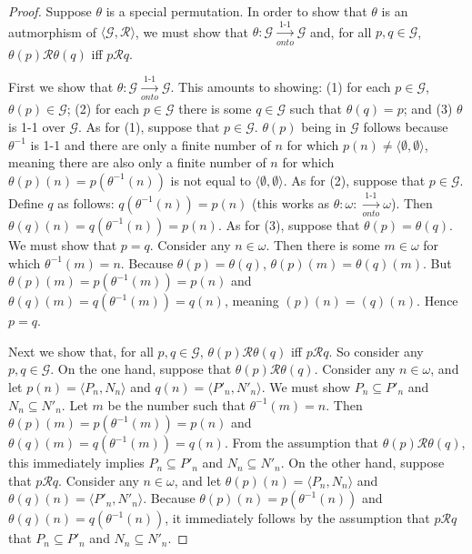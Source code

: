 \documentclass{article}
\theoremstyle{definition}
\begin{document}
\begin{proof}
Suppose $\theta$ is a special permutation. In order to show that $\theta$ is an autmorphism of $\langle\mathcal{G},\mathcal{R}\rangle$, 
we must show that $\theta:\mathcal{G}\xrightarrow[onto]{\text{1-1}}\mathcal{G}$ and, for all $p,q\in\mathcal{G}$, 
$\theta(p)\mathcal{R}\theta(q)$ iff $p\mathcal{R}q$.

First we show that $\theta:\mathcal{G}\xrightarrow[onto]{\text{1-1}}\mathcal{G}$. This amounts to showing: (1) 
for each $p\in\mathcal{G}$, $\theta(p)\in\mathcal{G}$; (2) 
for each $p\in\mathcal{G}$ there is some $q\in\mathcal{G}$ such that $\theta(q)=p$; and (3) 
$\theta$ is 1-1 over $\mathcal{G}$. As for (1), suppose that $p\in\mathcal{G}$. $\theta(p)$ 
being in $\mathcal{G}$ follows because $\theta^{-1}$ is 1-1 and there are only a finite number of 
$n$ for which $p(n)\ne\langle\emptyset,\emptyset\rangle$, meaning there are also only a finite number of 
$n$ for which $\theta(p)(n)=p(\theta^{-1}(n))$ is not equal to $\langle\emptyset,\emptyset\rangle$. 
As for (2), suppose that $p\in\mathcal{G}$. Define $q$ as follows: 
$q(\theta^{-1}(n))=p(n)$ (this works as $\theta:\omega:\xrightarrow[onto]{\text{1-1}}\omega$).
Then $\theta(q)(n)=q(\theta^{-1}(n))=p(n)$. As for (3), suppose that 
$\theta(p)=\theta(q)$. We must show that $p=q$. Consider any 
$n\in\omega$. Then there is some $m\in\omega$ for which $\theta^{-1}(m)=n$. Because 
$\theta(p)=\theta(q)$, $\theta(p)(m)=\theta(q)(m)$. But 
$\theta(p)(m)=p(\theta^{-1}(m))=p(n)$ and $\theta(q)(m)=q(\theta^{-1}(m))=q(n)$, meaning 
$(p)(n)=(q)(n)$. Hence $p=q$.

Next we show that, for all $p,q\in\mathcal{G}$, $\theta(p)\mathcal{R}\theta(q)$ iff $p\mathcal{R}q$. So consider 
any $p,q\in\mathcal{G}$. On the one hand, suppose that 
$\theta(p)\mathcal{R}\theta(q)$. Consider any $n\in\omega$, and let 
$p(n)=\langle P_n,N_n\rangle$ and $q(n)=\langle P'_n,N'_n\rangle$. We must show 
$P_n\subseteq P'_n$ and $N_n\subseteq N'_n$. Let $m$ be the number such that $\theta^{-1}(m)=n$.
Then $\theta(p)(m)=p(\theta^{-1}(m))=p(n)$ and $\theta(q)(m)=q(\theta^{-1}(m))=q(n)$. From the assumption that 
$\theta(p)\mathcal{R}\theta(q)$, this immediately implies $P_n\subseteq P'_n$ and 
$N_n\subseteq N'_n$. On the other hand, suppose that $p\mathcal{R}q$. Consider any 
$n\in\omega$, and let $\theta(p)(n)=\langle P_n,N_n\rangle$ and $\theta(q)(n)=\langle P'_n,N'_n\rangle$. 
Because $\theta(p)(n)=p(\theta^{-1}(n))$ and $\theta(q)(n)=q(\theta^{-1}(n))$, it immediately follows by the assumption that 
$p\mathcal{R}q$ that $P_n\subseteq P'_n$ and $N_n\subseteq N'_n$.

\end{proof}
\end{document}
